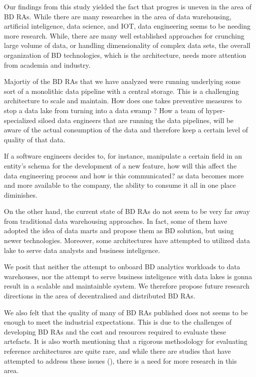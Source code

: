 \documentclass{ieeeaccess}
\begin{document}
Our findings from this study yielded the fact that progres is uneven in the area of BD RAs. While there are many researches in the area of data warehousing, artificial inteligence, data science, and IOT, data engineering seems to be needing more research. While, there are many well established approaches for crunching large volume of data, or handling dimensionality of complex data sets, the overall organization of BD technologies, which is the architecture, needs more attention from academia and industry. 

Majortiy of the BD RAs that we have analyzed were running underlying some sort of a monolithic data pipeline with a central storage. This is a challenging architecture to scale and maintain. How does one takes preventive measures to stop a data lake from turning into a data swamp ? How a team of hyper-specialized siloed data engineers that are running the data pipelines, will be aware of the actual consumption of the data and therefore keep a certain level of quality of that data.

If a software engineers decides to, for instance, manipulate a certain field in an entity's schema for the development of a new feature, how will this affect the data engineering process and how is this communicated? as data becomes more and more available to the company, the ability to consume it all in one place diminishes. 

On the other hand, the current state of BD RAs do not seem to be very far away from traditional data warehousing approaches. In fact, some of them have adopted the idea of data marts and propose them as BD solution, but using newer technologies. Moreover, some architectures have attempted to utilized data lake to serve data analysts and business inteligence. 

We posit that neither the attempt to onboard BD analytics workloads to data warehouses, nor the attempt to serve business inteligence with data lakes is gonna result in a scalable and maintainble system. We therefore propose future research directions in the area of decentralised and distributed BD RAs. 

We also felt that the quality of many of BD RAs published does not seems to be enough to meet the industrial expectations. This is due to the challenges of developing BD RAs and the cost and resources required to evaluate these artefacts. It is also worth mentioning that a rigorous methodology for evaluating reference architectures are quite rare, and while there are studies that have attempted to address these issues (\cite{angelov2008towards}), there is a need for more research in this area.
\end{document}
